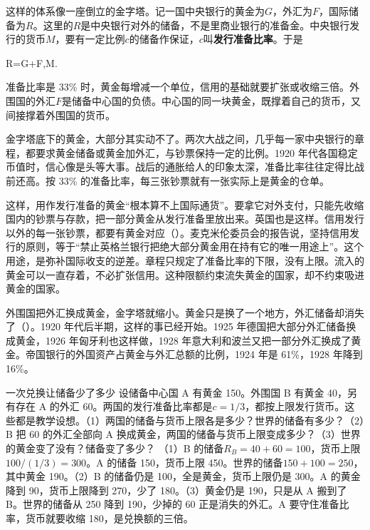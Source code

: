 这样的体系像一座倒立的金字塔。记一国中央银行的黄金为$G$，外汇为$F$，国际储备为$R$。这里的$R$是中央银行对外的储备，不是里商业银行的准备金。中央银行发行的货币$M$，要有一定比例$c$的储备作保证，$c$叫\textbf{发行准备比率}。于是
\begin{keyeq}
R=G+F,\qquad M\le{}.\label{eq:interwar-pyramid}
\end{keyeq}
准备比率是 33\% 时，黄金每增减一个单位，信用的基础就要扩张或收缩三倍\cite{nurkse1944}。外围国的外汇$F$是储备中心国的负债。中心国的同一块黄金，既撑着自己的货币，又间接撑着外围国的货币。

金字塔底下的黄金，大部分其实动不了。两次大战之间，几乎每一家中央银行的章程，都要求黄金储备或黄金加外汇，与钞票保持一定的比例\cite{nurkse1944}。1920 年代各国稳定币值时，信心像是头等大事。战后的通胀给人的印象太深，准备比率往往定得比战前还高\cite{nurkse1944}。按 33\% 的准备比率，每三张钞票就有一张实际上是黄金的仓单\cite{nurkse1944}。

这样，用作发行准备的黄金“根本算不上国际通货”。要拿它对外支付，只能先收缩国内的钞票与存款，把一部分黄金从发行准备里放出来\cite{nurkse1944}。英国也是这样。信用发行以外的每一张钞票，都要有黄金对应（）。麦克米伦委员会的报告说，坚持信用发行的原则，等于“禁止英格兰银行把绝大部分黄金用在持有它的唯一用途上”\cite{nurkse1944}。这个用途，是弥补国际收支的逆差\cite{nurkse1944}。章程只规定了准备比率的下限，没有上限\cite{nurkse1944}。流入的黄金可以一直存着，不必扩张信用。这种限额约束流失黄金的国家，却不约束吸进黄金的国家。

外围国把外汇换成黄金，金字塔就缩小。黄金只是换了一个地方，外汇储备却消失了（）。1920 年代后半期，这样的事已经开始。1925 年德国把大部分外汇储备换成黄金，1926 年匈牙利也这样做，1928 年意大利和波兰又把一部分外汇换成了黄金\cite{nurkse1944}。帝国银行的外国资产占黄金与外汇总额的比例，1924 年是 61\%，1928 年降到 16\%\cite{nurkse1944}。

\begin{example}{一次兑换让储备少了多少}\label{ex:interwar-pyramid}
设储备中心国 A 有黄金 150。外围国 B 有黄金 40，另有存在 A 的外汇 60。两国的发行准备比率都是$c=1/3$，都按上限发行货币。这些都是教学设想。（1）两国的储备与货币上限各是多少？世界的储备有多少？（2）B 把 60 的外汇全部向 A 换成黄金，两国的储备与货币上限变成多少？（3）世界的黄金变了没有？储备变了多少？
\solution （1）B 的储备$R_B=40+60=100$，货币上限$100/(1/3)=300$。A 的储备 150，货币上限 450。世界的储备$150+100=250$，其中黄金 190。（2）B 的储备仍是 100，全是黄金，货币上限仍是 300。A 的黄金降到 90，货币上限降到 270，少了 180。（3）黄金仍是 190，只是从 A 搬到了 B。世界的储备从 250 降到 190，少掉的 60 正是消失的外汇。A 要守住准备比率，货币就要收缩 180，是兑换额的三倍。
\end{example}

